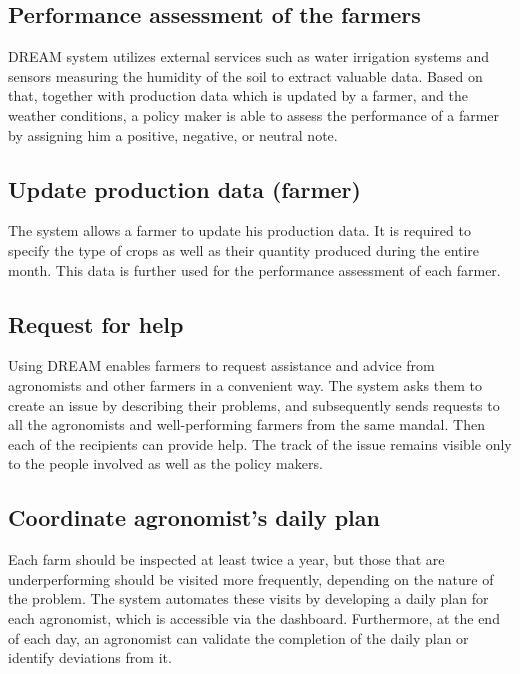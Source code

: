 \subsection{Performance assessment of the farmers}

DREAM system utilizes external services such as water irrigation systems and sensors measuring the humidity of the soil to extract valuable data. Based on that, together with production data which is updated by a farmer, and the weather conditions, a policy maker is able to assess the performance of a farmer by assigning him a positive, negative, or neutral note.

\subsection{Update production data (farmer)}

The system allows a farmer to update his production data. It is required to specify the type of crops as well as their quantity produced during the entire month. This data is further used for the performance assessment of each farmer.

\subsection{Request for help}

Using DREAM enables farmers to request assistance and advice from agronomists and other farmers in a convenient way. The system asks them to create an issue by describing their problems, and subsequently sends  requests to all the agronomists and well-performing farmers from the same mandal. Then each of the recipients can provide help. The track of the issue remains visible only to the people involved as well as the policy makers.

\subsection{Coordinate agronomist's daily plan}

Each farm should be inspected at least twice a year, but those that are underperforming should be visited more frequently, depending on the nature of the problem. The system automates these visits by developing a daily plan for each agronomist, which is accessible via the dashboard. Furthermore, at the end of each day, an agronomist can validate the completion of the daily plan or identify deviations from it.

